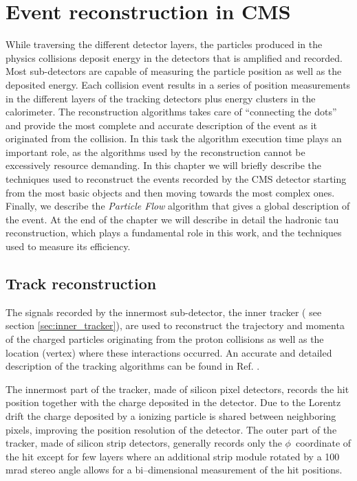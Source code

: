 \chapter{Event reconstruction in CMS}

While traversing the different detector layers, the particles produced in the physics collisions deposit energy in the detectors that is amplified and recorded. Most sub-detectors are capable of measuring the particle position as well as the deposited energy. Each collision event results in a series of position measurements in the different layers of the tracking detectors plus energy clusters in the calorimeter. The reconstruction algorithms takes care of ``connecting the dots'' and provide the most complete and accurate description of the event as it originated from the collision. In this task the algorithm execution time plays an important role, as the algorithms used by the reconstruction cannot be excessively resource demanding. In this chapter we will briefly describe the techniques used to reconstruct the events recorded by the CMS detector starting from the most basic objects and then moving towards the most complex ones. Finally, we describe the \emph{Particle Flow} algorithm that gives a global description of the event. At the end of the chapter we will describe in detail the hadronic tau reconstruction, which plays a fundamental role in this work, and the techniques used to measure its efficiency.

\section{Track reconstruction}

The signals recorded by the innermost sub-detector, the inner tracker ( see section \ref{sec:inner_tracker}), are used to reconstruct the trajectory and momenta of the charged particles originating from the proton collisions as well as the location (vertex) where these interactions occurred. An accurate and detailed description of the tracking algorithms can be found in Ref. \cite{cms_trk_11_01}.

The innermost part of the tracker, made of silicon pixel detectors, records the hit position together with the charge deposited in the detector. Due to the Lorentz drift the charge deposited by a ionizing particle is shared between neighboring pixels, improving the position resolution of the detector. The outer part of the tracker, made of silicon strip detectors, generally records only the $\phi$\ coordinate of the hit except for few layers where an additional strip module rotated by a 100 mrad stereo angle allows for a bi--dimensional measurement of the hit positions.

